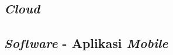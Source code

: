 \subsection{\emph{Cloud}}

\lipsum[1]

\subsection{\emph{Software} - Aplikasi \emph{Mobile}}

\lipsum[1]